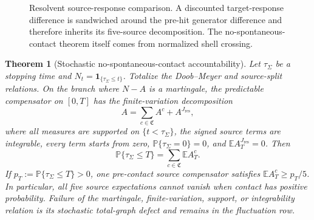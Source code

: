 \documentclass[11pt]{article}
\numberwithin{section}{part}
\theoremstyle{plain}
\newtheorem{theorem}{Theorem}[section]
\theoremstyle{definition}
\theoremstyle{remark}
\newcommand{\Res}{J_{\mathrm{res}}}
\newcommand{\Channels}{\mathfrak C}
\begin{document}
\begin{figure}[tbp]
\centering
{}
\caption{Resolvent source-response comparison.  A discounted target-response
difference is sandwiched around the pre-hit generator difference and therefore
inherits its five-source decomposition.  The no-spontaneous-contact theorem
itself comes from normalized shell crossing.}
\label{fig:resolvent-prospective}
\end{figure}

\begin{theorem}[Stochastic no-spontaneous-contact accountability]
\label{thm:stochastic-prospective-accountability}
Let \(\tau_\Sigma\) be a stopping time and
\(N_t=\mathbf 1_{\{\tau_\Sigma\le t\}}\).  Totalize the Doob--Meyer and
source-split relations.  On the branch where \(N-A\) is a martingale, the
predictable compensator on \([0,T]\) has the finite-variation
decomposition
\begin{equation}
 \label{eq:compensator-source-decomposition}
 A=\sum_{c\in\Channels}A^c+A^{\Res},
\end{equation}
where all measures are supported on \(\{t<\tau_\Sigma\}\), the signed source
terms are integrable, every term starts from zero,
\(\mathbb P\{\tau_\Sigma=0\}=0\), and
\(\mathbb E A_T^{\Res}=0\).  Then
\begin{equation}
 \label{eq:stochastic-prospective-factorization}
 \mathbb P\{\tau_\Sigma\le T\}
 =\sum_{c\in\Channels}\mathbb E A_T^c.
\end{equation}
If \(p_T:=\mathbb P\{\tau_\Sigma\le T\}>0\), one pre-contact source
compensator satisfies \(\mathbb E A_T^c\ge p_T/5\).  In particular, all five
source expectations cannot vanish when contact has positive probability.
Failure of the martingale, finite-variation, support, or integrability
relation is its stochastic total-graph defect and remains in the fluctuation
row.
\end{theorem}
\end{document}

